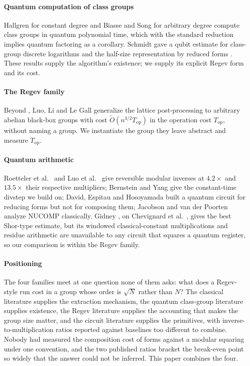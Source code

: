\documentclass[conference]{IEEEtran}
\begin{document}
\paragraph*{Quantum computation of class groups} Hallgren \cite{hallgren2005} for constant degree and Biasse and Song \cite{biasse2016} for arbitrary degree compute class groups in quantum polynomial time, which with the standard reduction \cite{cohen1993} implies quantum factoring as a corollary. Schmidt gave a qubit estimate for class-group discrete logarithms \cite{schmidt2006} and the half-size representation by reduced forms \cite{schmidt2009}. These results supply the algorithm's existence; we supply its explicit Regev form and its cost.

\paragraph*{The Regev family} Beyond \cite{regev2023,ragavan2024,ekera2024,pilatte2024}, Luo, Li and Le Gall \cite{luo2026} generalize the lattice post-processing to arbitrary abelian black-box groups with cost $\tilde O(n^{3/2}T_{\mathrm{op}})$ in the operation cost $T_{\mathrm{op}}$, without naming a group. We instantiate the group they leave abstract and measure $T_{\mathrm{op}}$.

\paragraph*{Quantum arithmetic} Roetteler et al.~\cite{roetteler2017} and Luo et al.~\cite{luo2026b} give reversible modular inverses at $4.2\times$ and $13.5\times$ their respective multipliers; Bernstein and Yang \cite{bernstein2019} give the constant-time divstep we build on; David, Espitau and Hosoyamada \cite{david2022} built a quantum circuit for reducing forms but not for composing them; Jacobson and van der Poorten \cite{jacobson2002} analyze NUCOMP classically. Gidney \cite{gidney2025}, on Chevignard et al.~\cite{chevignard2024}, gives the best Shor-type estimate, but its windowed classical-constant multiplications and residue arithmetic are unavailable to any circuit that squares a quantum register, so our comparison is within the Regev family.

\paragraph*{Positioning} The four families meet at one question none of them asks: what does a Regev-style run cost in a group whose order is $\sqrt N$ rather than $N$? The classical literature supplies the extraction mechanism, the quantum class-group literature supplies existence, the Regev literature supplies the accounting that makes the group size matter, and the circuit literature supplies the primitives, with inverse-to-multiplication ratios reported against baselines too different to combine. Nobody had measured the composition cost of forms against a modular squaring under one convention, and the two published ratios bracket the break-even point so widely that the answer could not be inferred. This paper combines the four.
\end{document}
